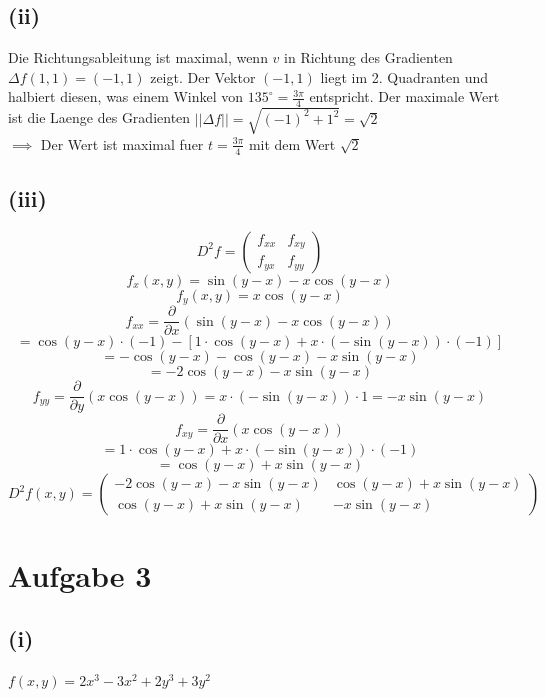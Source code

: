 \documentclass{article}
\begin{document}
\subsection*{(ii)}
Die Richtungsableitung ist maximal, wenn $v$ in Richtung des Gradienten $\Delta f(1,1) = (-1, 1)$ zeigt. Der Vektor $(-1, 1)$ liegt im 2. Quadranten und halbiert diesen, was einem Winkel von $135^{\circ} = \frac{3 \pi}{4}$ entspricht. Der maximale Wert ist die Laenge des Gradienten $||\Delta f|| = \sqrt{(-1)^2 + 1^2} = \sqrt{2}$ \\
\newline
$\implies$ Der Wert ist maximal fuer $t = \frac{3\pi}{4}$ mit dem Wert $\sqrt{2}$

\subsection*{(iii)}
\[D^2 f = \begin{pmatrix}
    f_{xx} & f_{xy} \\ f_{yx} & f_{yy}
\end{pmatrix}\]
\[f_x(x,y) = \sin(y-x) - x\cos(y-x)\]
\[f_y(x,y) = x\cos(y-x)\]
\newline
\[f_{xx} = \frac{\partial}{\partial x}(\sin(y-x) - x\cos(y-x))\]
\[= \cos(y-x)\cdot(-1) - \left[ 1 \cdot \cos(y-x) + x \cdot (-\sin(y-x)) \cdot (-1) \right]\]
\[= -\cos(y-x) - \cos(y-x) - x\sin(y-x)\]
\[= -2\cos(y-x) - x\sin(y-x)\]
\newline
\[f_{yy} = \frac{\partial}{\partial y}(x\cos(y-x)) = x \cdot (-\sin(y-x)) \cdot 1 = -x\sin(y-x)\]
\newline
\[f_{xy} = \frac{\partial}{\partial x}(x\cos(y-x))\]
\[= 1 \cdot \cos(y-x) + x \cdot (-\sin(y-x)) \cdot (-1)\]
\[= \cos(y-x) + x\sin(y-x)\]
\newline
\[D^2f(x,y) = \begin{pmatrix}
-2\cos(y-x) - x\sin(y-x) & \cos(y-x) + x\sin(y-x) \\
\cos(y-x) + x\sin(y-x) & -x\sin(y-x)
\end{pmatrix}\]

\section*{Aufgabe 3}


\subsection*{(i)}
$f(x,y) = 2x^3 - 3x^2 + 2y^3 + 3y^2$
\end{document}
